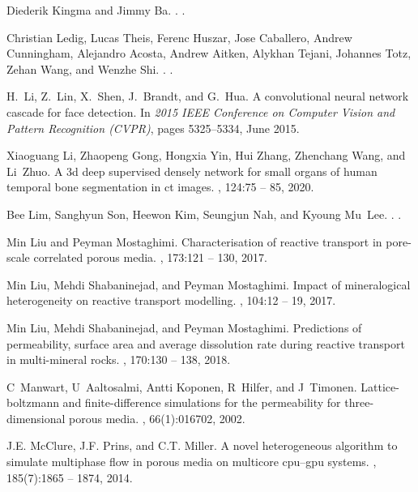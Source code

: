 \documentclass{article}
\begin{document}
\begin{thebibliography}{10}
Diederik Kingma and Jimmy Ba.
.
.

Christian Ledig, Lucas Theis, Ferenc Huszar, Jose Caballero, Andrew Cunningham,
  Alejandro Acosta, Andrew Aitken, Alykhan Tejani, Johannes Totz, Zehan Wang,
  and Wenzhe Shi.
.
.

H.~{Li}, Z.~{Lin}, X.~{Shen}, J.~{Brandt}, and G.~{Hua}.
\newblock A convolutional neural network cascade for face detection.
\newblock In {\em 2015 IEEE Conference on Computer Vision and Pattern
  Recognition (CVPR)}, pages 5325--5334, June 2015.

Xiaoguang Li, Zhaopeng Gong, Hongxia Yin, Hui Zhang, Zhenchang Wang, and
  Li~Zhuo.
\newblock A 3d deep supervised densely network for small organs of human
  temporal bone segmentation in ct images.
, 124:75 -- 85, 2020.

Bee Lim, Sanghyun Son, Heewon Kim, Seungjun Nah, and Kyoung Mu~Lee.
.
.

Min Liu and Peyman Mostaghimi.
\newblock Characterisation of reactive transport in pore-scale correlated
  porous media.
, 173:121 -- 130, 2017.

Min Liu, Mehdi Shabaninejad, and Peyman Mostaghimi.
\newblock Impact of mineralogical heterogeneity on reactive transport
  modelling.
, 104:12 -- 19, 2017.

Min Liu, Mehdi Shabaninejad, and Peyman Mostaghimi.
\newblock Predictions of permeability, surface area and average dissolution
  rate during reactive transport in multi-mineral rocks.
, 170:130 -- 138,
  2018.

C~Manwart, U~Aaltosalmi, Antti Koponen, R~Hilfer, and J~Timonen.
\newblock Lattice-boltzmann and finite-difference simulations for the
  permeability for three-dimensional porous media.
, 66(1):016702, 2002.

J.E. McClure, J.F. Prins, and C.T. Miller.
\newblock A novel heterogeneous algorithm to simulate multiphase flow in porous
  media on multicore cpu–gpu systems.
, 185(7):1865 -- 1874, 2014.


\end{thebibliography}
\end{document}
